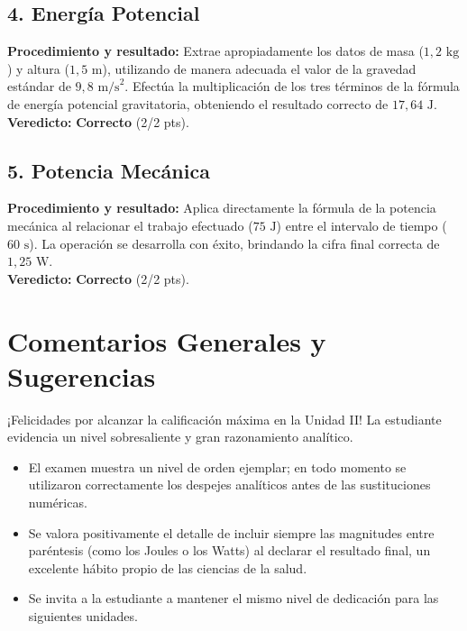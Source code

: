 \documentclass[12pt,letterpaper]{article}
\begin{document}
\subsection*{4. Energía Potencial}
\textbf{Procedimiento y resultado:} Extrae apropiadamente los datos de masa ($1,2 \text{ kg}$) y altura ($1,5 \text{ m}$), utilizando de manera adecuada el valor de la gravedad estándar de $9,8 \text{ m/s}^2$. Efectúa la multiplicación de los tres términos de la fórmula de energía potencial gravitatoria, obteniendo el resultado correcto de $17,64 \text{ J}$. \\
\textbf{Veredicto:} \textbf{Correcto} (2/2 pts).

\subsection*{5. Potencia Mecánica}
\textbf{Procedimiento y resultado:} Aplica directamente la fórmula de la potencia mecánica al relacionar el trabajo efectuado ($75 \text{ J}$) entre el intervalo de tiempo ($60 \text{ s}$). La operación se desarrolla con éxito, brindando la cifra final correcta de $1,25 \text{ W}$. \\
\textbf{Veredicto:} \textbf{Correcto} (2/2 pts).

\vspace{0.5cm}
\section*{Comentarios Generales y Sugerencias}
¡Felicidades por alcanzar la calificación máxima en la Unidad II! La estudiante evidencia un nivel sobresaliente y gran razonamiento analítico.
\begin{itemize}
    \item El examen muestra un nivel de orden ejemplar; en todo momento se utilizaron correctamente los despejes analíticos antes de las sustituciones numéricas.
    \item Se valora positivamente el detalle de incluir siempre las magnitudes entre paréntesis (como los Joules o los Watts) al declarar el resultado final, un excelente hábito propio de las ciencias de la salud.
    \item Se invita a la estudiante a mantener el mismo nivel de dedicación para las siguientes unidades.
\end{itemize}
\end{document}
